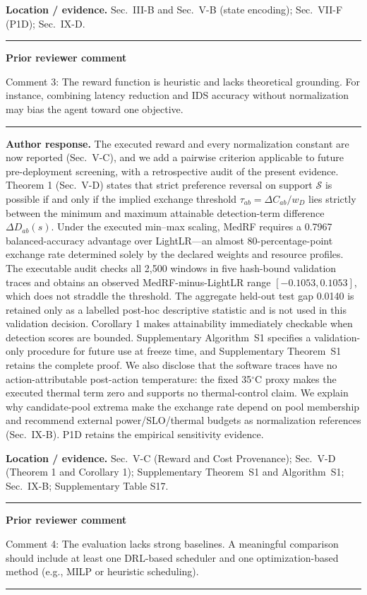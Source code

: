 \documentclass[11pt]{article}
\newenvironment{qbox}
    {\par\vspace{4pt}\noindent\begin{minipage}{\linewidth}\rule{\linewidth}{0.4pt}\par\noindent\textbf{Prior reviewer comment}\par\noindent}
    {\par\rule{\linewidth}{0.4pt}\end{minipage}\par\vspace{4pt}}
\begin{document}
\textbf{Location / evidence.} Sec.~III-B and Sec.~V-B (state encoding); Sec.~VII-F (P1D); Sec.~IX-D.

\begin{qbox}
Comment 3: The reward function is heuristic and lacks theoretical grounding. For instance, combining latency reduction and IDS accuracy without normalization may bias the agent toward one objective.
\end{qbox}

\textbf{Author response.} The executed reward and every normalization constant are now reported (Sec.~V-C), and we add a pairwise criterion applicable to future pre-deployment screening, with a retrospective audit of the present evidence. Theorem 1 (Sec.~V-D) states that strict preference reversal on support $\mathcal S$ is possible if and only if the implied exchange threshold $\tau_{ab}=\Delta C_{ab}/w_D$ lies strictly between the minimum and maximum attainable detection-term difference $\Delta D_{ab}(s)$. Under the executed min--max scaling, MedRF requires a 0.7967 balanced-accuracy advantage over LightLR---an almost 80-percentage-point exchange rate determined solely by the declared weights and resource profiles. The executable audit checks all 2{,}500 windows in five hash-bound validation traces and obtains an observed MedRF-minus-LightLR range $[-0.1053,0.1053]$, which does not straddle the threshold. The aggregate held-out test gap 0.0140 is retained only as a labelled post-hoc descriptive statistic and is not used in this validation decision. Corollary 1 makes attainability immediately checkable when detection scores are bounded. Supplementary Algorithm~S1 specifies a validation-only procedure for future use at freeze time, and Supplementary Theorem~S1 retains the complete proof. We also disclose that the software traces have no action-attributable post-action temperature: the fixed 35$^{\circ}$C proxy makes the executed thermal term zero and supports no thermal-control claim. We explain why candidate-pool extrema make the exchange rate depend on pool membership and recommend external power/SLO/thermal budgets as normalization references (Sec.~IX-B). P1D retains the empirical sensitivity evidence.

\textbf{Location / evidence.} Sec.~V-C (Reward and Cost Provenance); Sec.~V-D (Theorem 1 and Corollary 1); Supplementary Theorem~S1 and Algorithm~S1; Sec.~IX-B; Supplementary Table S17.

\begin{qbox}
Comment 4: The evaluation lacks strong baselines. A meaningful comparison should include at least one DRL-based scheduler and one optimization-based method (e.g., MILP or heuristic scheduling).
\end{qbox}
\end{document}
